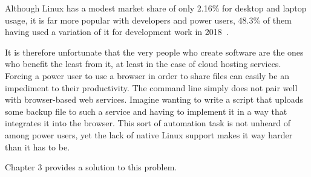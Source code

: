 Although Linux has a modest market share of only 2.16\% for desktop and laptop usage, it is far more popular with developers and power users, 48.3\% of them having used a variation of it for development work in 2018~\cite{linux_market_share,stack_overflow_developer_survey_results}.

It is therefore unfortunate that the very people who create software are the ones who benefit the least from it, at least in the case of cloud hosting services. Forcing a power user to use a browser in order to share files can easily be an impediment to their productivity. The command line simply does not pair well with browser-based web services. Imagine wanting to write a script that uploads some backup file to such a service and having to implement it in a way that integrates it into the browser. This sort of automation task is not unheard of among power users, yet the lack of native Linux support makes it way harder than it has to be.

Chapter 3 provides a solution to this problem.
